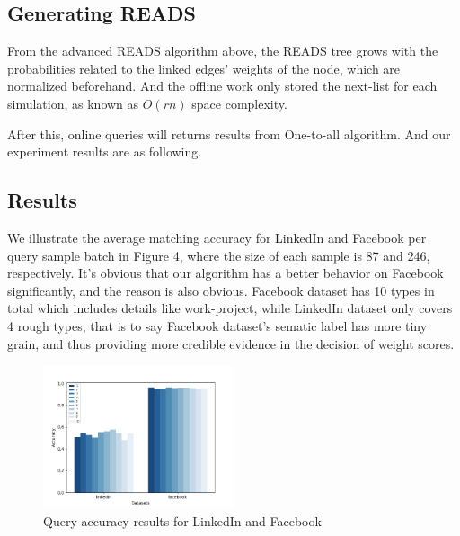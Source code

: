 \documentclass[a4paper, 12pt]{article} %
\begin{document}
    \subsection{\textbf{Generating READS}}
    
    From the advanced READS algorithm above, the READS tree grows with the probabilities related to the linked edges' weights of the node, which are normalized beforehand. And the offline work only stored the next-list for each simulation, as known as $O(rn)$ space complexity.
    
    After this, online queries will returns results from One-to-all algorithm. And our experiment results are as following.
    
    \subsection{Results}
    
    We illustrate the average matching accuracy for LinkedIn and Facebook per query sample batch in Figure 4, where the size of each sample is 87 and 246, respectively. It's obvious that our algorithm has a better behavior on Facebook significantly, and the reason is also obvious. Facebook dataset has 10 types in total which includes details like work-project, while LinkedIn dataset only covers 4 rough types, that is to say Facebook dataset's sematic label has more tiny grain, and thus providing more credible evidence in the decision of weight scores.
    
    \begin{figure}[H]
        \centering
        \includegraphics[width=0.5\textwidth]{img/linkedin-facebook.png}
        \caption{Query accuracy results for LinkedIn and Facebook}
    \end{figure}
    
\end{document}
